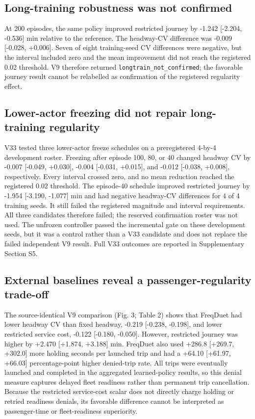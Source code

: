 \documentclass[preprint,12pt,authoryear,nopreprintline]{elsarticle}
\begin{document}
\subsection{Long-training robustness was not
confirmed}\label{long-training-robustness-was-not-confirmed}

At 200 episodes, the same policy improved restricted journey by -1.242
{[}-2.204, -0.536{]} min relative to the reference. The headway-CV
difference was -0.009 {[}-0.028, +0.006{]}. Seven of eight training-seed
CV differences were negative, but the interval included zero and the
mean improvement did not reach the registered 0.02 threshold. V9
therefore returned \texttt{longtrain\_not\_confirmed}; the favorable
journey result cannot be relabelled as confirmation of the registered
regularity effect.

\subsection{Lower-actor freezing did not repair long-training
regularity}\label{lower-actor-freezing-did-not-repair-long-training-regularity}

V33 tested three lower-actor freeze schedules on a preregistered 4-by-4
development roster. Freezing after episode 100, 80, or 40 changed
headway CV by -0.007 {[}-0.049, +0.030{]}, -0.004 {[}-0.031, +0.015{]},
and -0.012 {[}-0.038, +0.008{]}, respectively. Every interval crossed
zero, and no mean reduction reached the registered 0.02 threshold. The
episode-40 schedule improved restricted journey by -1.954 {[}-3.190,
-1.077{]} min and had negative headway-CV differences for 4 of 4
training seeds. It still failed the registered magnitude and interval
requirements. All three candidates therefore failed; the reserved
confirmation roster was not used. The unfrozen controller passed the
incremental gate on these development seeds, but it was a control rather
than a V33 candidate and does not replace the failed independent V9
result. Full V33 outcomes are reported in Supplementary Section S5.

\subsection{External baselines reveal a passenger-regularity
trade-off}\label{external-baselines-reveal-a-passenger-regularity-trade-off}

The source-identical V9 comparison (Fig. 3; Table 2) shows that FreqDuet
had lower headway CV than fixed headway, -0.219 {[}-0.238, -0.198{]},
and lower restricted service cost, -0.122 {[}-0.180, -0.050{]}. However,
restricted journey was higher by +2.470 {[}+1.874, +3.188{]} min.
FreqDuet also used +286.8 {[}+269.7, +302.0{]} more holding seconds per
launched trip and had a +64.10 {[}+61.97, +66.03{]} percentage-point
higher denied-trip rate. All trips were eventually launched and
completed in the aggregated learned-policy results, so this denial
measure captures delayed fleet readiness rather than permanent trip
cancellation. Because the restricted service-cost scalar does not
directly charge holding or retried readiness denials, its favorable
difference cannot be interpreted as passenger-time or fleet-readiness
superiority.
\end{document}
